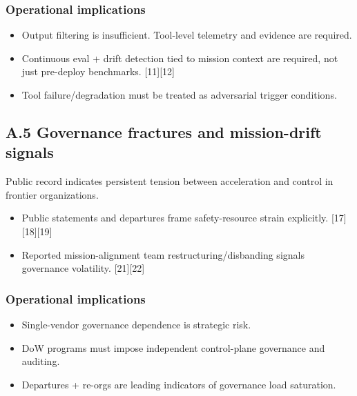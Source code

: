 \documentclass[
]{article}
\providecommand{\tightlist}{%
  \setlength{\itemsep}{0pt}\setlength{\parskip}{0pt}}
\begin{document}
\hypertarget{operational-implications-3}{%
\subsubsection{Operational
implications}\label{operational-implications-3}}

\begin{itemize}
\tightlist
\item
  Output filtering is insufficient. Tool-level telemetry and evidence
  are required.
\item
  Continuous eval + drift detection tied to mission context are
  required, not just pre-deploy benchmarks. {[}11{]}{[}12{]}
\item
  Tool failure/degradation must be treated as adversarial trigger
  conditions.
\end{itemize}

\hypertarget{a.5-governance-fractures-and-mission-drift-signals}{%
\subsection{A.5 Governance fractures and mission-drift
signals}\label{a.5-governance-fractures-and-mission-drift-signals}}

Public record indicates persistent tension between acceleration and
control in frontier organizations.

\begin{itemize}
\tightlist
\item
  Public statements and departures frame safety-resource strain
  explicitly. {[}17{]}{[}18{]}{[}19{]}
\item
  Reported mission-alignment team restructuring/disbanding signals
  governance volatility. {[}21{]}{[}22{]}
\end{itemize}

\hypertarget{operational-implications-4}{%
\subsubsection{Operational
implications}\label{operational-implications-4}}

\begin{itemize}
\tightlist
\item
  Single-vendor governance dependence is strategic risk.
\item
  DoW programs must impose independent control-plane governance and
  auditing.
\item
  Departures + re-orgs are leading indicators of governance load
  saturation.
\end{itemize}
\end{document}
